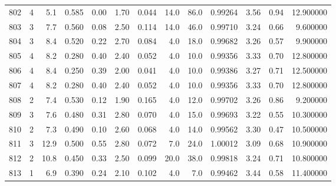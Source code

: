 \begin{tabular}{lrrrrrrrrrrrr}
802  &        4 &            5.1 &             0.585 &         0.00 &            1.70 &      0.044 &                 14.0 &                  86.0 &  0.99264 &  3.56 &       0.94 &  12.900000 \\
803  &        3 &            7.7 &             0.560 &         0.08 &            2.50 &      0.114 &                 14.0 &                  46.0 &  0.99710 &  3.24 &       0.66 &   9.600000 \\
804  &        3 &            8.4 &             0.520 &         0.22 &            2.70 &      0.084 &                  4.0 &                  18.0 &  0.99682 &  3.26 &       0.57 &   9.900000 \\
805  &        4 &            8.2 &             0.280 &         0.40 &            2.40 &      0.052 &                  4.0 &                  10.0 &  0.99356 &  3.33 &       0.70 &  12.800000 \\
806  &        4 &            8.4 &             0.250 &         0.39 &            2.00 &      0.041 &                  4.0 &                  10.0 &  0.99386 &  3.27 &       0.71 &  12.500000 \\
807  &        4 &            8.2 &             0.280 &         0.40 &            2.40 &      0.052 &                  4.0 &                  10.0 &  0.99356 &  3.33 &       0.70 &  12.800000 \\
808  &        2 &            7.4 &             0.530 &         0.12 &            1.90 &      0.165 &                  4.0 &                  12.0 &  0.99702 &  3.26 &       0.86 &   9.200000 \\
809  &        3 &            7.6 &             0.480 &         0.31 &            2.80 &      0.070 &                  4.0 &                  15.0 &  0.99693 &  3.22 &       0.55 &  10.300000 \\
810  &        2 &            7.3 &             0.490 &         0.10 &            2.60 &      0.068 &                  4.0 &                  14.0 &  0.99562 &  3.30 &       0.47 &  10.500000 \\
811  &        3 &           12.9 &             0.500 &         0.55 &            2.80 &      0.072 &                  7.0 &                  24.0 &  1.00012 &  3.09 &       0.68 &  10.900000 \\
812  &        2 &           10.8 &             0.450 &         0.33 &            2.50 &      0.099 &                 20.0 &                  38.0 &  0.99818 &  3.24 &       0.71 &  10.800000 \\
813  &        1 &            6.9 &             0.390 &         0.24 &            2.10 &      0.102 &                  4.0 &                   7.0 &  0.99462 &  3.44 &       0.58 &  11.400000 \\

\end{tabular}
